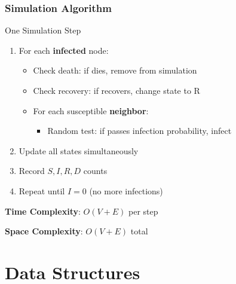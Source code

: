\documentclass{beamer}
\begin{document}
\begin{frame}[fragile]
\frametitle{Simulation Algorithm}

\begin{block}{One Simulation Step}
\begin{enumerate}
    \item For each \textbf{infected} node:
    \begin{itemize}
        \item Check death: if dies, remove from simulation
        \item Check recovery: if recovers, change state to R
        \item For each susceptible \textbf{neighbor}:
        \begin{itemize}
            \item Random test: if passes infection probability, infect
        \end{itemize}
    \end{itemize}
    \item Update all states simultaneously
    \item Record $S, I, R, D$ counts
    \item Repeat until $I = 0$ (no more infections)
\end{enumerate}
\end{block}

\vspace{0.5cm}

\textbf{Time Complexity}: $O(V + E)$ per step

\textbf{Space Complexity}: $O(V + E)$ total
\end{frame}

\section{Data Structures}
\end{document}

